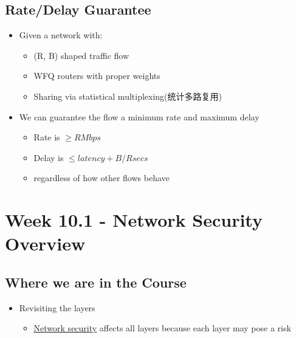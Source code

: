 \documentclass[12pt]{ctexart}   %
\begin{document}
	\subsection{Rate/Delay Guarantee}
	\begin{itemize}
		\item Given a network with:
		\begin{itemize}
			\item (R, B) shaped traffic flow
			\item WFQ routers with proper weights
			\item Sharing via statistical multiplexing(统计多路复用)
		\end{itemize}

		\item  We can guarantee the flow a minimum rate and maximum delay
		\begin{itemize}
			\item Rate is $\geqslant R Mbps$
			\item Delay is $\leqslant latency + B/R secs$
			\item regardless of how other flows behave
		\end{itemize}
	\end{itemize}
	
 \section{Week 10.1 - Network Security Overview}
	\subsection{Where we are in the Course}
	\begin{itemize}
		\item Revisiting the layers
		\begin{itemize}
			\item \underline{Network security} affects all layers because each layer may pose a risk
		\end{itemize}
	\end{itemize}
\end{document}
